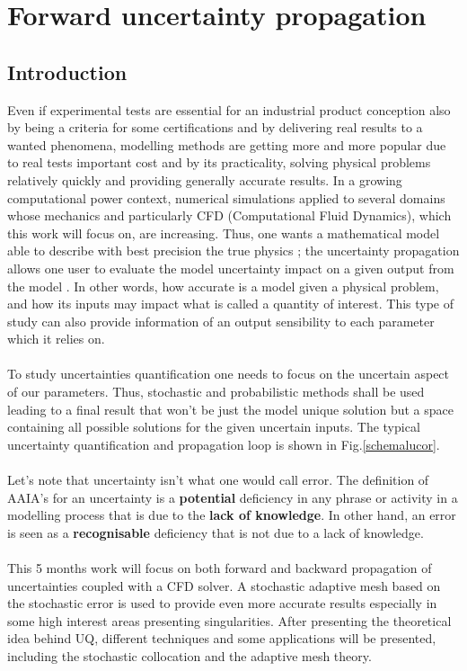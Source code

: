 \documentclass[11pt, a4paper, English]{report}
\begin{document}
\color{blue!40!black}\chapter{Forward uncertainty propagation}\color{black}
\section{Introduction}
Even if experimental tests are essential for an industrial product conception also by being a criteria for some certifications and by delivering real results to a wanted phenomena, modelling methods are getting more and more popular due to real tests important cost and by its practicality, solving physical problems relatively quickly and providing generally accurate results.
In a growing computational power context, numerical simulations applied to several domains whose mechanics and particularly CFD (Computational Fluid Dynamics), which this work will focus on, are increasing. Thus, one wants a mathematical model able to describe with best precision the true physics ; the uncertainty propagation allows one user to evaluate the model uncertainty impact on a given output from the model \cite{CoursLucor}.
In other words, how accurate is a model given a physical problem, and how its inputs may impact what is called a quantity of interest. This type of study can also provide information of an output sensibility to each parameter which it relies on.
\\\\
To study uncertainties quantification one needs to focus on the uncertain aspect of our parameters. Thus, stochastic and probabilistic methods shall be used leading to a final result that won't be just the model unique solution but a space containing all possible solutions for the given uncertain inputs. The typical uncertainty quantification and propagation loop is shown in Fig.\ref{schemalucor}.
\\\\
Let's note that uncertainty isn't what one would call error. The definition of AAIA's \cite{AIAA} for an uncertainty is a \textbf{potential} deficiency in any phrase or activity in a modelling process that is due to the \textbf{lack of knowledge}. In other hand, an error is seen as a \textbf{recognisable} deficiency that is not due to a lack of knowledge. 
\\\\
This 5 months work will focus on both forward and backward propagation of uncertainties coupled with a CFD solver. A stochastic adaptive mesh based on the stochastic error is used to provide even more accurate results especially in some high interest areas presenting singularities. %
After presenting the theoretical idea behind UQ, different techniques and some applications will be presented, including the stochastic collocation and the adaptive mesh theory.
\end{document}
